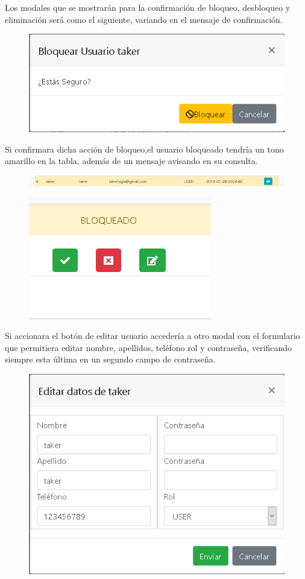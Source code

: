 Los modales que se mostrar\'{a}n para la confirmaci\'{o}n de bloqueo, desbloqueo y eliminaci\'{o}n ser\'{a} como el siguiente, variando en el mensaje de confirmaci\'{o}n.

\begin{figure}[h!]
\centering
\includegraphics[width=.6\textwidth]{Img/ManualUsuario/ADMIN_BLOCK_USER.png}
\end{figure}

Si confirmara dicha acci\'{o}n de bloqueo,el usuario bloqueado tendr\'{i}a un tono amarillo en la tabla, adem\'{a}s de un mensaje avisando en su consulta.

\begin{figure}[h!]
\centering
\includegraphics[width=1\textwidth]{Img/ManualUsuario/ADMIN_USER_BLOCKED.png}
\end{figure}

\begin{figure}[h!]
\centering
\includegraphics[width=.4\textwidth]{Img/ManualUsuario/ADMIN_BLOCKED_READ_USER.png}
\end{figure}

Si accionara el bot\'{o}n de editar usuario acceder\'{i}a a otro modal con el formulario que permitiera editar nombre, apellidos, tel\'{e}fono rol y contrase\~{n}a, verificando siempre esta \'{u}ltima en un segundo campo de contrase\~{n}a.


\begin{figure}[h!]
\centering
\includegraphics[width=.4\textwidth]{Img/ManualUsuario/ADMIN_EDIT_USER.png}
\end{figure}

